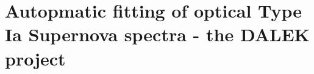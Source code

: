 \chapter{Autopmatic fitting of optical Type Ia Supernova spectra - the DALEK project}
\label{chap:dalek}



